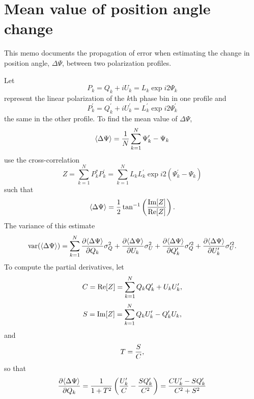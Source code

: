 \documentclass[12pt]{article}
\newcommand{\real}{{\rm Re}}
\newcommand{\imag}{{\rm Im}}
\begin{document}
\section{Mean value of position angle change}

This memo documents the propagation of error when estimating the
change in position angle, $\Delta\Psi$, between two polarization
profiles.

Let
\begin{equation}
P_k = Q_k + i U_k = L_k \exp i2\Psi_k
\end{equation}
represent the linear polarization of the $k$th phase bin in one profile and
\begin{equation}
P^\prime_k = Q^\prime_k + i U^\prime_k = L^\prime_k \exp i2\Psi^\prime_k
\end{equation}
the same in the other profile.  To find the mean value of $\Delta\Psi$,
\begin{equation}
\langle\Delta\Psi\rangle = {1\over N}\sum_{k=1}^N \Psi^\prime_k - \Psi_k
\end{equation}
use the cross-correlation
\begin{equation}
Z = \sum_{k=1}^N P^*_k P^\prime_k 
  = \sum_{k=1}^N L_k L^\prime_k \exp i2(\Psi^\prime_k - \Psi_k)
\end{equation}
such that
\begin{equation}
\langle\Delta\Psi\rangle
={1\over2}\tan^{-1}\left({\imag[Z]\over\real[Z]}\right).
\end{equation}
The variance of this estimate
\begin{equation}
{\rm var}(\langle\Delta\Psi\rangle) = \sum_{k=1}^N 
{\partial\langle\Delta\Psi\rangle\over\partial Q_k} \sigma_Q^2 +
{\partial\langle\Delta\Psi\rangle\over\partial U_k} \sigma_U^2 +
{\partial\langle\Delta\Psi\rangle\over\partial Q^\prime_k} \sigma_Q^{\prime2} +
{\partial\langle\Delta\Psi\rangle\over\partial U^\prime_k} \sigma_U^{\prime2}.
\end{equation}
To compute the partial derivatives, let
\begin{equation}
C = \real[Z] = \sum_{k=1}^N Q_kQ^\prime_k + U_kU^\prime_k,
\end{equation}
\begin{equation}
S = \imag[Z] = \sum_{k=1}^N Q_kU^\prime_k - Q^\prime_kU_k,
\end{equation}
and
\begin{equation}
T = {S\over C},
\end{equation}
so that
\begin{equation}
{\partial\langle\Delta\Psi\rangle\over\partial Q_k} 
= {1\over1+T^2} \left( {U^\prime_k \over C} - {S Q^\prime_k\over C^2} \right)
= { C U^\prime_k - S Q^\prime_k \over C^2 + S^2 }
\end{equation}
\end{document}
